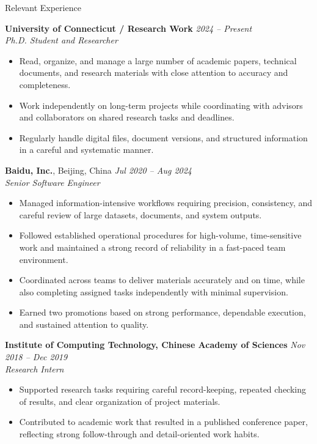 \documentclass[]{resume}
\newcommand{\sectionvspace}{\vspace{1.5pt}}
\begin{document}
\begin{rSection}{Relevant Experience}\sectionvspace

\textbf{University of Connecticut / Research Work} \hfill \textit{2024 -- Present}\\
\textit{Ph.D. Student and Researcher}
\begin{itemize}
    \item Read, organize, and manage a large number of academic papers, technical documents, and research materials with close attention to accuracy and completeness.
    \item Work independently on long-term projects while coordinating with advisors and collaborators on shared research tasks and deadlines.
    \item Regularly handle digital files, document versions, and structured information in a careful and systematic manner.
\end{itemize}

\textbf{Baidu, Inc.}, Beijing, China \hfill \textit{Jul 2020 -- Aug 2024}\\
\textit{Senior Software Engineer}
\begin{itemize}
    \item Managed information-intensive workflows requiring precision, consistency, and careful review of large datasets, documents, and system outputs.
    \item Followed established operational procedures for high-volume, time-sensitive work and maintained a strong record of reliability in a fast-paced team environment.
    \item Coordinated across teams to deliver materials accurately and on time, while also completing assigned tasks independently with minimal supervision.
    \item Earned two promotions based on strong performance, dependable execution, and sustained attention to quality.
\end{itemize}

\textbf{Institute of Computing Technology, Chinese Academy of Sciences} \hfill \textit{Nov 2018 -- Dec 2019}\\
\textit{Research Intern}
\begin{itemize}
    \item Supported research tasks requiring careful record-keeping, repeated checking of results, and clear organization of project materials.
    \item Contributed to academic work that resulted in a published conference paper, reflecting strong follow-through and detail-oriented work habits.
\end{itemize}

\end{rSection}
\end{document}
